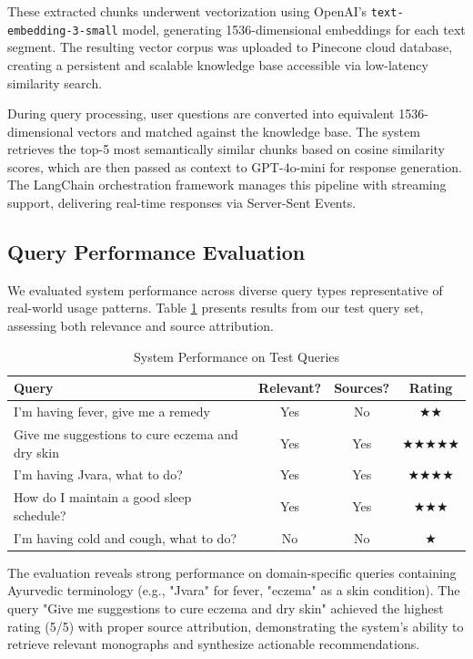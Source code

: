 \documentclass[conference]{IEEEtran}
\begin{document}
These extracted chunks underwent vectorization using OpenAI's \texttt{text-embedding-3-small} model, generating 1536-dimensional embeddings for each text segment. The resulting vector corpus was uploaded to Pinecone cloud database, creating a persistent and scalable knowledge base accessible via low-latency similarity search.

During query processing, user questions are converted into equivalent 1536-dimensional vectors and matched against the knowledge base. The system retrieves the top-5 most semantically similar chunks based on cosine similarity scores, which are then passed as context to GPT-4o-mini for response generation. The LangChain orchestration framework manages this pipeline with streaming support, delivering real-time responses via Server-Sent Events.

\subsection{Query Performance Evaluation}
We evaluated system performance across diverse query types representative of real-world usage patterns. Table \ref{tab:performance} presents results from our test query set, assessing both relevance and source attribution.

\begin{table}[htbp]
\caption{System Performance on Test Queries}
\begin{center}
\begin{tabular}{|p{3cm}|c|c|c|}
\hline
\textbf{Query} & \textbf{Relevant?} & \textbf{Sources?} & \textbf{Rating} \\
\hline
I'm having fever, give me a remedy & Yes & No & ★★ \\
\hline
Give me suggestions to cure eczema and dry skin & Yes & Yes & ★★★★★ \\
\hline
I'm having Jvara, what to do? & Yes & Yes & ★★★★ \\
\hline
How do I maintain a good sleep schedule? & Yes & Yes & ★★★ \\
\hline
I'm having cold and cough, what to do? & No & No & ★ \\
\hline
\end{tabular}
\label{tab:performance}
\end{center}
\end{table}

The evaluation reveals strong performance on domain-specific queries containing Ayurvedic terminology (e.g., "Jvara" for fever, "eczema" as a skin condition). The query "Give me suggestions to cure eczema and dry skin" achieved the highest rating (5/5) with proper source attribution, demonstrating the system's ability to retrieve relevant monographs and synthesize actionable recommendations.
\end{document}
